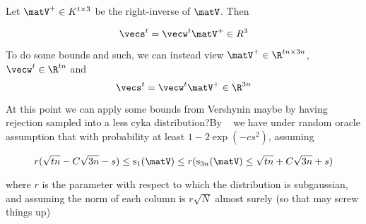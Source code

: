 

Let $\matV^{+} \in K^{t \times 3}$ be the right-inverse of
$\matV$. Then 

\[\vecs^{t}=\vecw^{t}\matV^{+} \in R^{3}\]

To do some bounds and such, we can instead view $\matV^{+} \in \R^{tn
  \times 3n}$, $\vecw^{t} \in \R^{tn}$ and 
\[\vecs^{t}=\vecw^{t}\matV^{+} \in \R^{3n}\]

At this point we can apply some bounds from Vershynin
maybe by having rejection sampled into a less cyka
distribution?By ~\cite[Theorem 5.58]{DBLP:books/cu/12/VershyninEK12}
we have under random oracle assumption that with probability at least
$1-2\exp(-cs^2)$,  assuming 

\[r(\sqrt{tn}-C\sqrt{3n}-s) \leq \text{s}_{1}(\matV) \leq
  r(\text{s}_{3n}(\matV) \leq \sqrt{tn}+C\sqrt{3n}+s)\]

where $r$ is the parameter with respect to which the distribution is
subgaussian, and assuming the norm of each column is $r\sqrt{N}$
almost surely (so that may screw things up)








